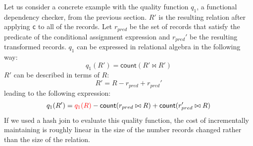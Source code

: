 Let us consider a concrete example with the quality function $q_1$, a functional dependency checker, from the previous section.
$R'$ is the resulting relation after applying \texttt{c} to all of the records.
Let $r_{pred}$ be the set of records that satisfy the predicate of the conditional assignment expression and $r_{pred}'$ be the resulting transformed records.
$q_1$ can be expressed in relational algebra in the following way:
\[
q_1(R') = \textsf{count}( R' \bowtie R' )
\]
$R'$ can be described in terms of $R$:
\[
R' = R - r_{pred} + r_{pred}' 
\]
leading to the following expression:
\[
q_1(R') = \textcolor{red}{q_1(R)} - \textsf{count}( r_{pred} \bowtie R )  + \textsf{count}( r'_{pred} \bowtie R )
\]
If we used a hash join to evaluate this quality function, the cost of incrementally maintaining is roughly linear in the size of the number records changed rather than the size of the relation.




